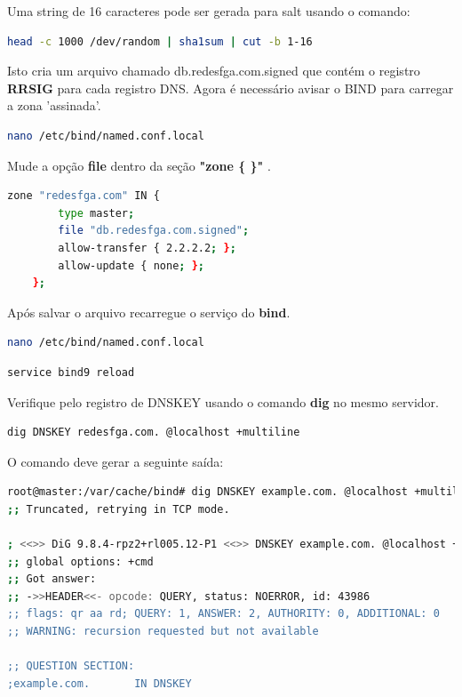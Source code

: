 \documentclass[12pt,openright,a4paper]{report}
\begin{document}
{Uma string de 16 caracteres pode ser gerada para salt usando o comando:
\begin{lstlisting}[language=bash]
	head -c 1000 /dev/random | sha1sum | cut -b 1-16
\end{lstlisting}

Isto cria um arquivo chamado db.redesfga.com.signed que contém o registro \textbf{RRSIG} para cada registro DNS. Agora é necessário avisar o BIND para carregar a zona 'assinada'.
\begin{lstlisting}[language=bash]
	nano /etc/bind/named.conf.local
\end{lstlisting}

Mude a opção \textbf{file} dentro da seção \textbf{"zone \{ \}" }.
\begin{lstlisting}[language=bash]
	zone "redesfga.com" IN {
	    type master;
	    file "db.redesfga.com.signed";
	    allow-transfer { 2.2.2.2; };
    	allow-update { none; };
	};
\end{lstlisting}

Após salvar o arquivo recarregue o serviço do \textbf{bind}.
\begin{lstlisting}[language=bash]
	nano /etc/bind/named.conf.local
\end{lstlisting}

\begin{lstlisting}[language=bash]
	service bind9 reload
\end{lstlisting}

Verifique pelo registro de DNSKEY usando o comando \textbf{dig} no mesmo servidor.
\begin{lstlisting}[language=bash]
	dig DNSKEY redesfga.com. @localhost +multiline
\end{lstlisting}

O comando deve gerar a seguinte saída:
\begin{lstlisting}[language=bash]
root@master:/var/cache/bind# dig DNSKEY example.com. @localhost +multiline
;; Truncated, retrying in TCP mode.

; <<>> DiG 9.8.4-rpz2+rl005.12-P1 <<>> DNSKEY example.com. @localhost +multiline
;; global options: +cmd
;; Got answer:
;; ->>HEADER<<- opcode: QUERY, status: NOERROR, id: 43986
;; flags: qr aa rd; QUERY: 1, ANSWER: 2, AUTHORITY: 0, ADDITIONAL: 0
;; WARNING: recursion requested but not available

;; QUESTION SECTION:
;example.com.       IN DNSKEY


\end{lstlisting}}
\end{document}
